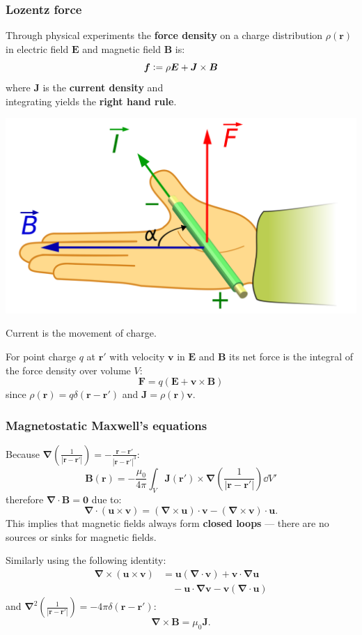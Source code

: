 \documentclass{article}
\newcommand{\deq}{\vcentcolon=}
\newcommand{\vc}[1]{\boldsymbol{#1}}
\begin{document}
\begin{multicols*}{3}
\subsubsection*{Lozentz force}
Through physical experiments the \textbf{force density}
on a charge distribution $\rho(\vc{r})$
in electric field $\vc{E}$ and magnetic field $\vc{B}$ is:
$$\vc{f}\deq\rho\vc{E}+\vc{J}\times\vc{B}$$
where $\vc{J}$ is the \textbf{current density}
and \\ integrating yields the \textbf{right hand rule}.
\begin{center}
    \includegraphics[scale=0.05]{f07.png}
\end{center}
Current is the movement of charge.

For point charge $q$ at $\vc{r}'$ with velocity $\vc{v}$
in $\vc{E}$ and $\vc{B}$ its net force is the integral of the
force density over volume $V$:
$$\vc{F}=q(\vc{E}+\vc{v}\times\vc{B})$$
since $\rho(\vc{r})=q\delta(\vc{r}-\vc{r}')$
and $\vc{J}=\rho(\vc{r})\vc{v}$.

\subsubsection*{Magnetostatic Maxwell's equations}
Because $\displaystyle\vc{\nabla}\left(
\frac{1}{|\vc{r}-\vc{r}'|}\right)
=-\frac{\vc{r}-\vc{r}'}{|\vc{r}-\vc{r}'|^3}$:
$$\vc{B}(\vc{r})=-\frac{\mu_0}{4\pi}\int_V
\vc{J}(\vc{r}')\times\vc{\nabla}
\left(\frac{1}{|\vc{r}-\vc{r}'|}\right)\dd V'$$
therefore $\vc{\nabla}\cdot\vc{B}=\vc{0}$ due to:
$$\vc{\nabla}\cdot(\vc{u}\times\vc{v})
=(\vc{\nabla}\times\vc{u})\cdot\vc{v}
-(\vc{\nabla}\times\vc{v})\cdot\vc{u}.$$
This implies that magnetic fields always form
\textbf{closed loops} --- there are no sources
or sinks for magnetic fields.

Similarly using the following identity:
\begin{align*}
    \vc{\nabla}\times(\vc{u}\times\vc{v})
    &=\vc{u}(\vc{\nabla}\cdot\vc{v})
    +\vc{v}\cdot\vc{\nabla}\vc{u} \\
    &\quad-\vc{u}\cdot\vc{\nabla}\vc{v}
    -\vc{v}(\vc{\nabla}\cdot\vc{u})
\end{align*}
and $\displaystyle\vc{\nabla}^2\left(
\frac{1}{|\vc{r}-\vc{r}'|}\right)
=-4\pi\delta(\vc{\vc{r}-\vc{r}'})$:
$$\vc{\nabla}\times\vc{B}=\mu_0\vc{J}.$$


\end{multicols*}
\end{document}

